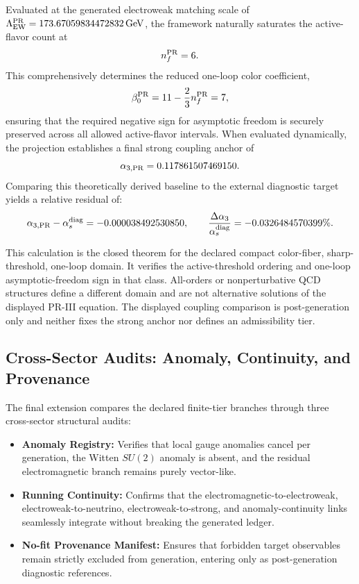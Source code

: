\documentclass[11pt]{article}
\begin{document}
Evaluated at the generated electroweak matching scale of $\Lambda_{\rm EW}^{\rm PR}=173.67059834472832\,{\rm GeV}$, the framework naturally saturates the active-flavor count at
\begin{equation}
n_f^{\rm PR}=6.
\end{equation}
This comprehensively determines the reduced one-loop color coefficient,
\begin{equation}
\beta_0^{\rm PR}=11-\frac23 n_f^{\rm PR}=7,
\end{equation}
ensuring that the required negative sign for asymptotic freedom is securely preserved across all allowed active-flavor intervals. When evaluated dynamically, the projection establishes a final strong coupling anchor of
\begin{equation}
\alpha_{3,{\rm PR}}=0.117861507469150.
\end{equation}
Comparing this theoretically derived baseline to the external diagnostic target yields a relative residual of:
\begin{equation}
\alpha_{3,{\rm PR}}-\alpha_s^{\rm diag}
=-0.000038492530850,
\qquad
\frac{\Delta\alpha_3}{\alpha_s^{\rm diag}}=-0.0326484570399\% .
\end{equation}

This calculation is the closed theorem for the declared compact color-fiber, sharp-threshold, one-loop domain.  It verifies the active-threshold ordering and one-loop asymptotic-freedom sign in that class.  All-orders or nonperturbative QCD structures define a different domain and are not alternative solutions of the displayed PR-III equation. The displayed coupling comparison is post-generation only and neither fixes
the strong anchor nor defines an admissibility tier.

\subsection{Cross-Sector Audits: Anomaly, Continuity, and Provenance}
\label{subsec:priii-global-obligation}

The final extension compares the declared finite-tier branches through three
cross-sector structural audits:
\begin{itemize}
    \item \textbf{Anomaly Registry:} Verifies that local gauge anomalies cancel per generation, the Witten $SU(2)$ anomaly is absent, and the residual electromagnetic branch remains purely vector-like.
    \item \textbf{Running Continuity:} Confirms that the electromagnetic-to-electroweak, electroweak-to-neutrino, electroweak-to-strong, and anomaly-continuity links seamlessly integrate without breaking the generated ledger.
    \item \textbf{No-fit Provenance Manifest:} Ensures that forbidden target observables remain strictly excluded from generation, entering only as post-generation diagnostic references.
\end{itemize}
\end{document}
